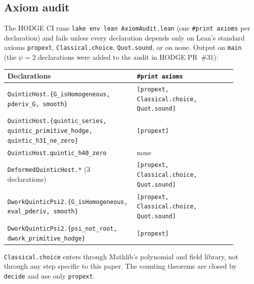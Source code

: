 \documentclass[11pt]{article}
\theoremstyle{definition}\newtheorem{definition}[theorem]{Definition}\newtheorem{remark}[theorem]{Remark}
\begin{document}
\subsection{Axiom audit}
The HODGE CI runs \texttt{lake env lean AxiomAudit.lean} (one \texttt{\#print axioms} per declaration)
and fails unless every declaration depends only on Lean's standard axioms
\texttt{propext}, \texttt{Classical.choice}, \texttt{Quot.sound}, or on none. Output on \texttt{main} (the $\psi=2$ declarations were added to the audit in HODGE PR~\#31):
\begin{center}\small
\begin{tabular}{p{0.52\linewidth}p{0.40\linewidth}}\toprule
Declarations & \texttt{\#print axioms}\\\midrule
\texttt{QuinticHost.\{G\_isHomogeneous, pderiv\_G, smooth\}} & \texttt{[propext, Classical.choice, Quot.sound]}\\
\texttt{QuinticHost.\{quintic\_series, quintic\_primitive\_hodge, quintic\_h31\_ne\_zero\}} & \texttt{[propext]}\\
\texttt{QuinticHost.quintic\_h40\_zero} & none\\
\texttt{DeformedQuinticHost.*} (3 declarations) & \texttt{[propext, Classical.choice, Quot.sound]}\\
\texttt{DworkQuinticPsi2.\{G\_isHomogeneous, eval\_pderiv, smooth\}} & \texttt{[propext, Classical.choice, Quot.sound]}\\
\texttt{DworkQuinticPsi2.\{psi\_not\_root, dwork\_primitive\_hodge\}} & \texttt{[propext]}\\
\bottomrule\end{tabular}\end{center}
\texttt{Classical.choice} enters through Mathlib's polynomial and field library, not through any
step specific to this paper. The counting theorems are closed by \texttt{decide} and use only \texttt{propext}.
\end{document}
